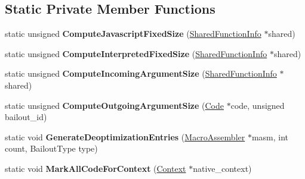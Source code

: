 \subsection*{Static Private Member Functions}
\begin{DoxyCompactItemize}
\item 
static unsigned {\bfseries Compute\+Javascript\+Fixed\+Size} (\hyperlink{classv8_1_1internal_1_1_shared_function_info}{Shared\+Function\+Info} $\ast$shared)\hypertarget{classv8_1_1internal_1_1_deoptimizer_a83f4a574c2eee7d9b71091bcb403caa5}{}\label{classv8_1_1internal_1_1_deoptimizer_a83f4a574c2eee7d9b71091bcb403caa5}

\item 
static unsigned {\bfseries Compute\+Interpreted\+Fixed\+Size} (\hyperlink{classv8_1_1internal_1_1_shared_function_info}{Shared\+Function\+Info} $\ast$shared)\hypertarget{classv8_1_1internal_1_1_deoptimizer_af40d3baa7b6e1888948c318328182fbf}{}\label{classv8_1_1internal_1_1_deoptimizer_af40d3baa7b6e1888948c318328182fbf}

\item 
static unsigned {\bfseries Compute\+Incoming\+Argument\+Size} (\hyperlink{classv8_1_1internal_1_1_shared_function_info}{Shared\+Function\+Info} $\ast$shared)\hypertarget{classv8_1_1internal_1_1_deoptimizer_ae5e8f9f5f89876ad1606348c01859b79}{}\label{classv8_1_1internal_1_1_deoptimizer_ae5e8f9f5f89876ad1606348c01859b79}

\item 
static unsigned {\bfseries Compute\+Outgoing\+Argument\+Size} (\hyperlink{classv8_1_1internal_1_1_code}{Code} $\ast$code, unsigned bailout\+\_\+id)\hypertarget{classv8_1_1internal_1_1_deoptimizer_a945899c5111422f819ff2e140f91fca2}{}\label{classv8_1_1internal_1_1_deoptimizer_a945899c5111422f819ff2e140f91fca2}

\item 
static void {\bfseries Generate\+Deoptimization\+Entries} (\hyperlink{classv8_1_1internal_1_1_macro_assembler}{Macro\+Assembler} $\ast$masm, int count, Bailout\+Type type)\hypertarget{classv8_1_1internal_1_1_deoptimizer_a412f71593c79dbab9d25d24bf389c911}{}\label{classv8_1_1internal_1_1_deoptimizer_a412f71593c79dbab9d25d24bf389c911}

\item 
static void {\bfseries Mark\+All\+Code\+For\+Context} (\hyperlink{classv8_1_1internal_1_1_context}{Context} $\ast$native\+\_\+context)\hypertarget{classv8_1_1internal_1_1_deoptimizer_a10544e0689b53b279c60c6c1c92cf980}{}\label{classv8_1_1internal_1_1_deoptimizer_a10544e0689b53b279c60c6c1c92cf980}


\end{DoxyCompactItemize}
